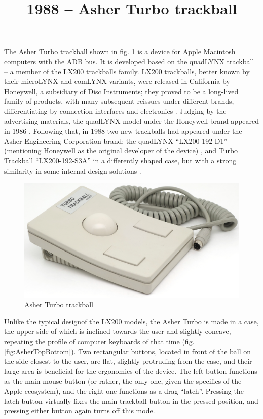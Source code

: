 \documentclass[11pt, a4paper]{article}
\begin{document}
\title{1988 -- Asher Turbo trackball}
\date{}
\maketitle
{}
The Asher Turbo trackball shown in fig. \ref{fig:AsherPic} is a device for Apple Macintosh computers with the ADB bus. It is developed based on the quadLYNX trackball -- a member of the LX200 trackballs family. LX200 trackballs, better known by their microLYNX and comLYNX variants, were released in California by Honeywell, a subsidiary of Disc Instruments; they proved to be a long-lived family of products, with many subsequent reissues under different brands, differentiating by connection interfaces and electronics \cite{lx200}. Judging by the advertising materials, the quadLYNX model under the Honeywell brand appeared in 1986 \cite{honeywell}. Following that, in 1988 two new trackballs had appeared under the Asher Engineering Corporation brand: the quadLYNX ``LX200-192-D1'' (mentioning Honeywell as the original developer of the device) \cite{asher}, and Turbo Trackball ``LX200-192-S3A'' in a differently shaped case, but with a strong similarity in some internal design solutions \cite{turbo}.

\begin{figure}[h]
    \centering
    \includegraphics[width=\textwidth]{1988_asher_turbo_trackball/pic_60.jpg}
    \caption{Asher Turbo trackball}
    \label{fig:AsherPic}
\end{figure}

Unlike the typical designof the LX200 models, the Asher Turbo is made in a case, the upper side of which is inclined towards the user and slightly concave, repeating the profile of computer keyboards of that time (fig. \ref{fig:AsherTopBottom}). Two rectangular buttons, located in front of the ball on the side closest to the user, are flat, slightly protruding from the case, and their large area is beneficial for the ergonomics of the device. The left button functions as the main mouse button (or rather, the only one, given the specifics of the Apple ecosystem), and the right one functions as a drag ``latch''. Pressing the latch button virtually fixes the main trackball button in the pressed position, and pressing either button again turns off this mode.
\end{document}
